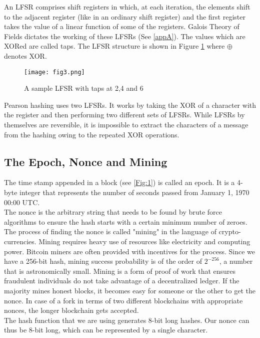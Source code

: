 An LFSR comprises shift registers in which, at each iteration, the elements shift to the adjacent register (like in an ordinary shift register) and the first register takes the value of a linear function of some of the registers. Galois Theory of Fields dictates the working of these LFSRs (See \ref{appA}). The values which are XORed are called taps.
The LFSR structure is shown in Figure \ref{Fig:3}
where $\oplus$ denotes XOR.
\begin{figure}[!htb]
   \begin{minipage}{\textwidth}
     \centering
     \texttt{[image: fig3.png]}
     \caption{A sample LFSR with taps at 2,4 and 6}
     \label{Fig:3}
   \end{minipage}
\end{figure}

Pearson hashing uses two LFSRs. It works by taking the XOR of a character with the register and then performing two different sets of LFSRs. While LFSRs by themselves are reversible, it is impossible to extract the characters of a message from the hashing owing to the repeated XOR operations.
\subsection{The Epoch, Nonce and Mining}
The time stamp appended in a block (see \ref{Fig:1}) is called an epoch. It is a 4-byte integer that represents the number of seconds passed from January 1, 1970 00:00 UTC.\\
The nonce is the arbitrary string that needs to be found by brute force algorithms to ensure the hash starts with a certain minimum number of zeroes. The process of finding the nonce is called "mining" in the language of crypto-currencies. Mining requires heavy use of resources like electricity and computing power. Bitcoin miners are often provided with incentives for the process. Since we have a 256-bit hash, mining success probability is of the order of $2^{-256}$, a number that is astronomically small. Mining is a form of proof of work that ensures fraudulent individuals do not take advantage of a decentralized ledger. If the majority mines honest blocks, it becomes easy for someone or the other to get the nonce. In case of a fork in terms of two different blockchains with appropriate nonces, the longer blockchain gets accepted.\\
The hash function that we are using generates 8-bit long hashes. Our nonce can thus be 8-bit long, which can be represented by a single character.